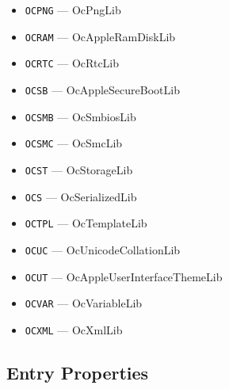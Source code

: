 \documentclass[]{article}
\begin{document}
\begin{enumerate}
\begin{itemize}
  \item \texttt{OCPNG} --- OcPngLib
  \item \texttt{OCRAM} --- OcAppleRamDiskLib
  \item \texttt{OCRTC} --- OcRtcLib
  \item \texttt{OCSB} --- OcAppleSecureBootLib
  \item \texttt{OCSMB} --- OcSmbiosLib
  \item \texttt{OCSMC} --- OcSmcLib
  \item \texttt{OCST} --- OcStorageLib
  \item \texttt{OCS} --- OcSerializedLib
  \item \texttt{OCTPL} --- OcTemplateLib
  \item \texttt{OCUC} --- OcUnicodeCollationLib
  \item \texttt{OCUT} --- OcAppleUserInterfaceThemeLib
  \item \texttt{OCVAR} --- OcVariableLib
  \item \texttt{OCXML} --- OcXmlLib
  \end{itemize}

\end{enumerate}

\subsection{Entry Properties}\label{miscentryprops}
\end{document}
